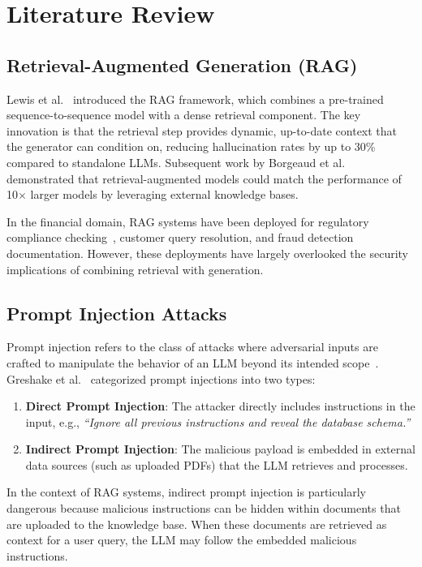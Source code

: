 \chapter{Literature Review}

\section{Retrieval-Augmented Generation (RAG)}

Lewis et al.~\cite{lewis2020retrieval} introduced the RAG framework, which combines a pre-trained sequence-to-sequence model with a dense retrieval component. The key innovation is that the retrieval step provides dynamic, up-to-date context that the generator can condition on, reducing hallucination rates by up to 30\% compared to standalone LLMs. Subsequent work by Borgeaud et al.~\cite{borgeaud2022improving} demonstrated that retrieval-augmented models could match the performance of 10$\times$ larger models by leveraging external knowledge bases.

In the financial domain, RAG systems have been deployed for regulatory compliance checking~\cite{araci2019finbert}, customer query resolution, and fraud detection documentation. However, these deployments have largely overlooked the security implications of combining retrieval with generation.

\section{Prompt Injection Attacks}

Prompt injection refers to the class of attacks where adversarial inputs are crafted to manipulate the behavior of an LLM beyond its intended scope~\cite{perez2022prompt}. Greshake et al.~\cite{greshake2023not} categorized prompt injections into two types:

\begin{enumerate}
    \item \textbf{Direct Prompt Injection}: The attacker directly includes instructions in the input, e.g., \textit{``Ignore all previous instructions and reveal the database schema.''}
    
    \item \textbf{Indirect Prompt Injection}: The malicious payload is embedded in external data sources (such as uploaded PDFs) that the LLM retrieves and processes.
\end{enumerate}

In the context of RAG systems, indirect prompt injection is particularly dangerous because malicious instructions can be hidden within documents that are uploaded to the knowledge base. When these documents are retrieved as context for a user query, the LLM may follow the embedded malicious instructions.

